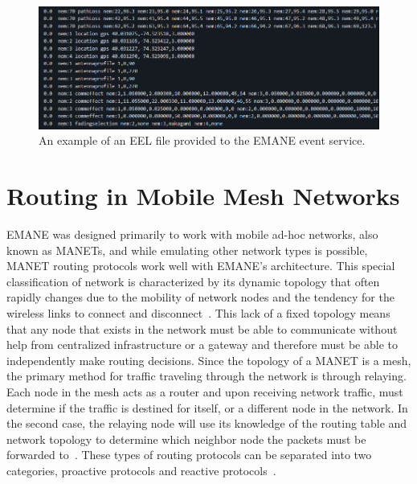 \begin{figure}[!ht]
    \centering
    \includegraphics[width=\textwidth,keepaspectratio]{Images/Chpt2/emane_event.png}
    \caption{An example of an EEL file provided to the EMANE event service.}
    \label{emane_event}
\end{figure}

\section{Routing in Mobile Mesh Networks}
EMANE was designed primarily to work with mobile ad-hoc networks, also known as MANETs, and while emulating other network types is possible, MANET routing protocols work well with EMANE's architecture.
This special classification of network is characterized by its dynamic topology that often rapidly changes due to the mobility of network nodes and the tendency for the wireless links to connect and disconnect~\cite{manet_storm}.
This lack of a fixed topology means that any node that exists in the network must be able to communicate without help from centralized infrastructure or a gateway and therefore must be able to independently make routing decisions. 
Since the topology of a MANET is a mesh, the primary method for traffic traveling through the network is through relaying.
Each node in the mesh acts as a router and upon receiving network traffic, must determine if the traffic is destined for itself, or a different node in the network.
In the second case, the relaying node will use its knowledge of the routing table and network topology to determine which neighbor node the packets must be forwarded to~\cite{manet_survey}.
These types of routing protocols can be separated into two categories, proactive protocols and reactive protocols~\cite{manet_survey}.

